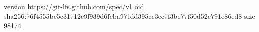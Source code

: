 version https://git-lfs.github.com/spec/v1
oid sha256:76f4555bc5c31712c9f939d6feba971dd395cc3ec7f3be77f50d52c791e86ed8
size 98174
